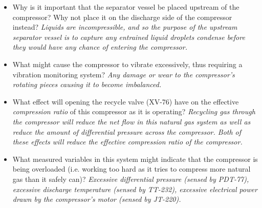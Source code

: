 
\begin{itemize}
\item{} Why is it important that the separator vessel be placed upstream of the compressor?  Why not place it on the discharge side of the compressor instead?  {\it Liquids are incompressible, and so the purpose of the upstream separator vessel is to capture any entrained liquid droplets condense before they would have any chance of entering the compressor.}
\vskip 10pt
\item{} What might cause the compressor to vibrate excessively, thus requiring a vibration monitoring system?  {\it Any damage or wear to the compressor's rotating pieces causing it to become imbalanced.}
\vskip 10pt
\item{} What effect will opening the recycle valve (XV-76) have on the effective {\it compression ratio} of this compressor as it is operating? {\it Recycling gas through the compressor will reduce the net flow in this natural gas system as well as reduce the amount of differential pressure across the compressor.  Both of these effects will reduce the effective compression ratio of the compressor.} 
\vskip 10pt
\item{} What measured variables in this system might indicate that the compressor is being overloaded (i.e. working too hard as it tries to compress more natural gas than it safely can)?  {\it Excessive differential pressure (sensed by PDT-77), excessive discharge temperature (sensed by TT-232), excessive electrical power drawn by the compressor's motor (sensed by JT-220).}
\end{itemize}












